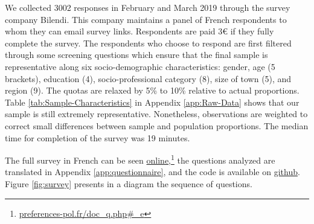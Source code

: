 \documentclass[english,5p,authoryear]{elsarticle}
\begin{document}
We collected 3002 responses in February and March 2019 through the survey company Bilendi. This company maintains a panel of French respondents to whom they can email survey links. Respondents are
paid 3\euro{} if they fully complete the survey. The respondents who choose to respond are first filtered through some screening questions which ensure that the final sample is representative along six socio-demographic characteristics: gender, age (5 brackets), education (4), socio-professional category (8), size of town (5), and region (9). The quotas are relaxed by 5\% to 10\% relative to actual proportions. Table \ref{tab:Sample-Characteristics} in Appendix \ref{app:Raw-Data} shows that our sample is still extremely representative. Nonetheless, observations are weighted to correct small differences between sample and population proportions. The median time for completion of the survey was 19 minutes. 

The full survey in French can be seen \href{http://preferences-pol.fr/doc_q.php#_e}{online},\footnote{\href{http:\/\/preferences-pol.fr\/doc\_q.php\#\_e}{preferences-pol.fr/doc\_q.php\#\_e}} the questions analyzed are translated in Appendix \ref{app:questionnaire}, and the code is available on \href{https://github.com/bixiou/beliefs_climate_policies}{github}. Figure \ref{fig:survey} presents in a diagram the sequence of  questions.
\end{document}
